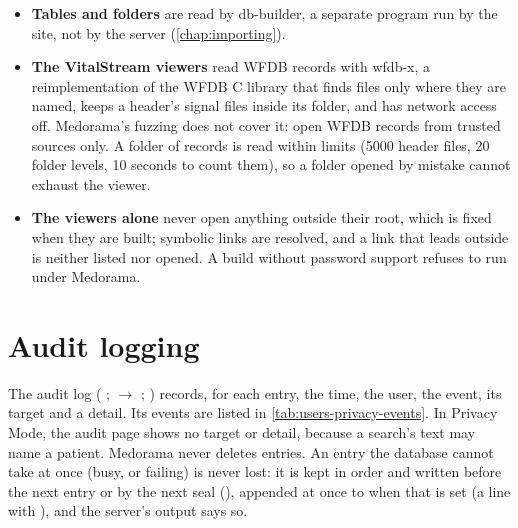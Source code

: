 \begin{itemize}
  control store itself (, ).
\item \textbf{Tables and folders} are read by db-builder, a separate program run by the site, not
  by the server (\cref{chap:importing}).
\item \textbf{The VitalStream viewers} read WFDB records with wfdb-x, a reimplementation of the
  WFDB C library that finds files only where they are named, keeps a header's signal files inside
  its folder, and has network access off. Medorama's fuzzing does not cover it: open WFDB records
  from trusted sources only. A folder of records is read within limits (5000 header files, 20
  folder levels, 10 seconds to count them), so a folder opened by mistake cannot exhaust the
  viewer.
\item \textbf{The viewers alone} never open anything outside their root, which is fixed when they
  are built; symbolic links are resolved, and a link that leads outside is neither listed nor
  opened. A build without password support refuses to run under Medorama.
\end{itemize}

\section{Audit logging}
\label{sec:security-audit}

The audit log ( ;  $\rightarrow$ ; )
records, for each entry, the time, the user, the event, its target and a detail. Its events are
listed in \cref{tab:users-privacy-events}. In Privacy Mode, the audit page shows no target or
detail, because a search's text may name a patient. Medorama never deletes entries. An entry the
database cannot take at once (busy, or failing) is never lost: it is kept in order and written
before the next entry or by the next seal (), appended at once to
 when that is set (a line with ), and the server's
output says so.

